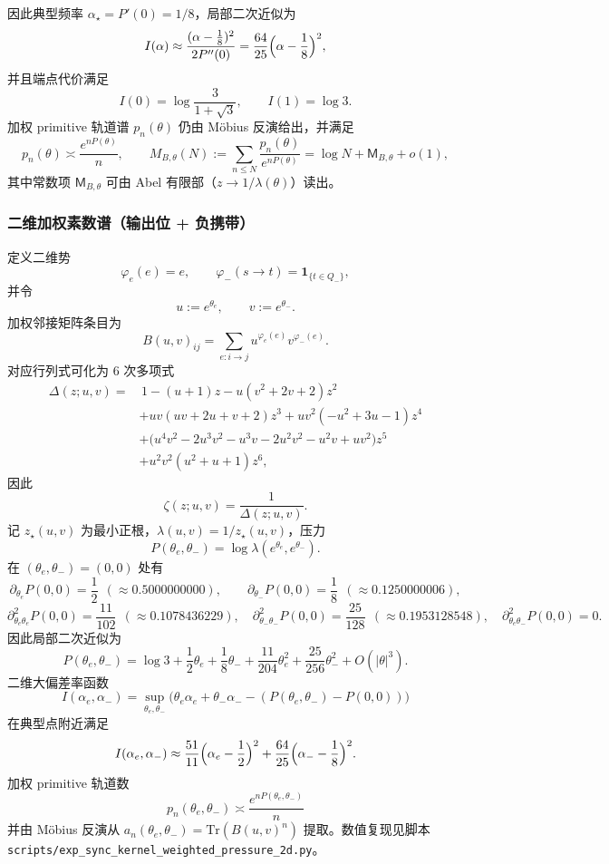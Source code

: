 
因此典型频率 $\alpha_\star=P'(0)=1/8$，局部二次近似为
\[
I(\alpha)\approx \frac{(\alpha-\frac18)^2}{2P''(0)}=\frac{64}{25}\Bigl(\alpha-\frac18\Bigr)^2,
\]
并且端点代价满足
\[
I(0)=\log\frac{3}{1+\sqrt3},\qquad I(1)=\log 3.
\]
加权 primitive 轨道谱 $p_n(\theta)$ 仍由 Möbius 反演给出，并满足
\[
p_n(\theta)\asymp \frac{e^{nP(\theta)}}{n},
\qquad
M_{B,\theta}(N):=\sum_{n\le N}\frac{p_n(\theta)}{e^{nP(\theta)}}=\log N+\mathsf{M}_{B,\theta}+o(1),
\]
其中常数项 $\mathsf{M}_{B,\theta}$ 可由 Abel 有限部（$z\to 1/\lambda(\theta)$）读出。

\subsubsection{二维加权素数谱（输出位 + 负携带）}
定义二维势
\[
\varphi_e(e)=e,\qquad \varphi_-(s\to t)=\mathbf{1}_{\{t\in Q_-\}},
\]
并令
\[
u:=e^{\theta_e},\qquad v:=e^{\theta_-}.
\]
加权邻接矩阵条目为
\[
B(u,v)_{ij}=\sum_{e:i\to j}u^{\varphi_e(e)}v^{\varphi_-(e)}.
\]
对应行列式可化为 6 次多项式
\[
\begin{aligned}
\Delta(z;u,v)=&\,1-(u+1)z-u(v^2+2v+2)z^2\\
&+uv(uv+2u+v+2)z^3+uv^2(-u^2+3u-1)z^4\\
&+\bigl(u^4v^2-2u^3v^2-u^3v-2u^2v^2-u^2v+uv^2\bigr)z^5\\
&+u^2v^2(u^2+u+1)z^6,
\end{aligned}
\]
因此
\[
\zeta(z;u,v)=\frac{1}{\Delta(z;u,v)}.
\]
记 $z_\star(u,v)$ 为最小正根，$\lambda(u,v)=1/z_\star(u,v)$，压力
\[
P(\theta_e,\theta_-)=\log\lambda(e^{\theta_e},e^{\theta_-}).
\]
在 $(\theta_e,\theta_-)=(0,0)$ 处有
\[
\partial_{\theta_e}P(0,0)=\frac12\ \ (\approx 0.5000000000),\qquad
\partial_{\theta_-}P(0,0)=\frac18\ \ (\approx 0.1250000006),
\]
\[
\partial^2_{\theta_e\theta_e}P(0,0)=\frac{11}{102}\ \ (\approx 0.1078436229),\quad
\partial^2_{\theta_-\theta_-}P(0,0)=\frac{25}{128}\ \ (\approx 0.1953128548),\quad
\partial^2_{\theta_e\theta_-}P(0,0)=0.
\]
因此局部二次近似为
\[
P(\theta_e,\theta_-)=\log 3+\frac12\theta_e+\frac18\theta_-+\frac{11}{204}\theta_e^2+\frac{25}{256}\theta_-^2+O(|\theta|^3).
\]
二维大偏差率函数
\[
I(\alpha_e,\alpha_-)=\sup_{\theta_e,\theta_-}\bigl(\theta_e\alpha_e+\theta_-\alpha_- - (P(\theta_e,\theta_-)-P(0,0))\bigr)
\]
在典型点附近满足
\[
I(\alpha_e,\alpha_-)\approx \frac{51}{11}\Bigl(\alpha_e-\frac12\Bigr)^2+\frac{64}{25}\Bigl(\alpha_- -\frac18\Bigr)^2.
\]
加权 primitive 轨道数
\[
p_n(\theta_e,\theta_-)\asymp \frac{e^{nP(\theta_e,\theta_-)}}{n}
\]
并由 Möbius 反演从 $a_n(\theta_e,\theta_-)=\mathrm{Tr}(B(u,v)^n)$ 提取。数值复现见脚本 \texttt{scripts/exp\_sync\_kernel\_weighted\_pressure\_2d.py}。

